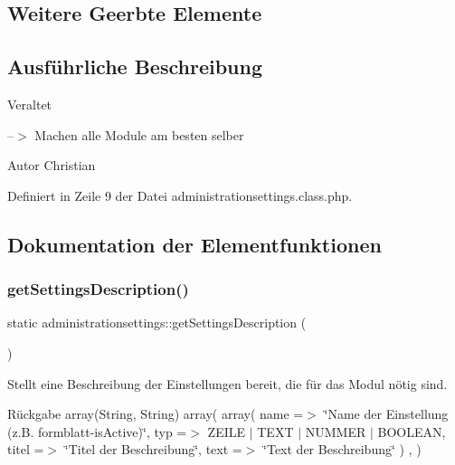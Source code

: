 \subsection*{Weitere Geerbte Elemente}


\subsection{Ausführliche Beschreibung}
\begin{DoxyRefDesc}{Veraltet}
\item[\mbox{\hyperlink{deprecated__deprecated000039}{Veraltet}}]--$>$ Machen alle Module am besten selber \end{DoxyRefDesc}
\begin{DoxyAuthor}{Autor}
Christian 
\end{DoxyAuthor}


Definiert in Zeile 9 der Datei administrationsettings.\+class.\+php.



\subsection{Dokumentation der Elementfunktionen}
\mbox{\label{classadministrationsettings_a7cf7753b06a6151e9437419796019f8e}} 
\subsubsection{\texorpdfstring{get\+Settings\+Description()}{getSettingsDescription()}}
{\footnotesize\ttfamily static administrationsettings\+::get\+Settings\+Description (\begin{DoxyParamCaption}{ }\end{DoxyParamCaption})\hspace{0.3cm}{\ttfamily [static]}}

Stellt eine Beschreibung der Einstellungen bereit, die für das Modul nötig sind. \begin{DoxyReturn}{Rückgabe}
array(\+String, String) array( array( \textquotesingle{}name\textquotesingle{} =$>$ \char`\"{}\+Name der Einstellung (z.\+B. formblatt-\/is\+Active)\char`\"{}, \textquotesingle{}typ\textquotesingle{} =$>$ Z\+E\+I\+LE $\vert$ T\+E\+XT $\vert$ N\+U\+M\+M\+ER $\vert$ B\+O\+O\+L\+E\+AN, \textquotesingle{}titel\textquotesingle{} =$>$ \char`\"{}\+Titel der Beschreibung\char`\"{}, \textquotesingle{}text\textquotesingle{} =$>$ \char`\"{}\+Text der Beschreibung\char`\"{} ) , ) 
\end{DoxyReturn}


